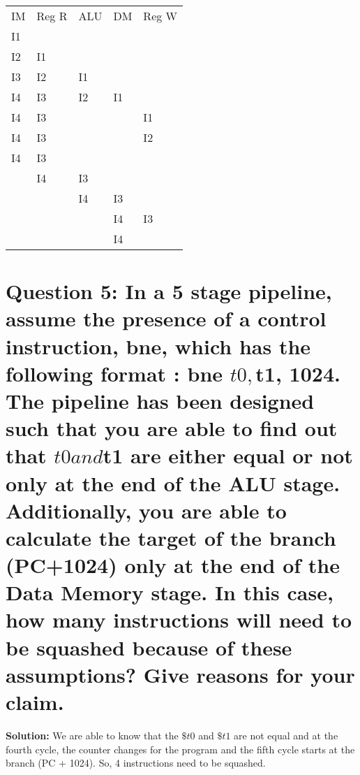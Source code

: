 \documentclass[11pt]{article}
\begin{document}
\begin{table}
\centering
\begin{tabular}{lllll}
IM & Reg R & ALU & DM & Reg W  \\
I1 &       &     &    &        \\
I2 & I1    &     &    &        \\
I3 & I2    & I1  &    &        \\
I4 & I3    & I2  & I1 &        \\
I4 & I3    &     &    & I1     \\
I4 & I3    &     &    & I2     \\
I4 & I3    &     &    &        \\
   & I4    & I3  &    &        \\
   &       & I4  & I3 &        \\
   &       &     & I4 & I3     \\
   &       &     & I4 &       
\end{tabular}
\end{table}


\section*{Question 5: In a 5 stage pipeline, assume the presence of a control instruction, bne, which has the following format : bne $t0,$t1, 1024. The pipeline has been designed such that you are able to find out that $t0 and $t1 are either equal or not only at the end of the ALU stage. Additionally, you are able to calculate the target of the branch (PC+1024) only at the end of the Data Memory stage. In this case, how many instructions will need to be squashed because of these assumptions?  Give reasons for your claim. }

\textbf{Solution: } We are able to know that the $\$t0$ and $\$t1$ are not equal and at the fourth cycle, the counter changes for the program and the fifth cycle starts at the branch (PC + 1024). So, 4 instructions need to be squashed.
\end{document}
